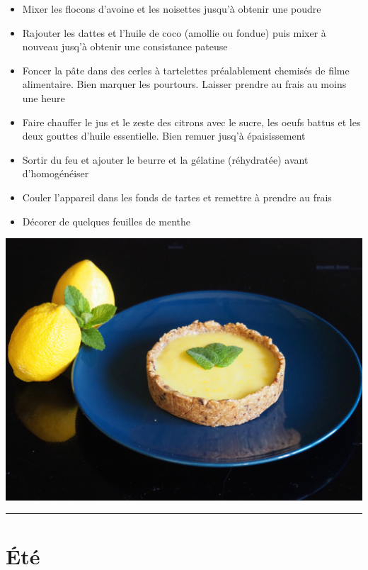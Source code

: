 \documentclass[]{book}
\providecommand{\tightlist}{%
  \setlength{\itemsep}{0pt}\setlength{\parskip}{0pt}}
\begin{document}
\begin{itemize}
\tightlist
\item
  Mixer les flocons d'avoine et les noisettes jusqu'à obtenir une poudre
\item
  Rajouter les dattes et l'huile de coco (amollie ou fondue) puis mixer à nouveau jusq'à obtenir une consistance pateuse
\item
  Foncer la pâte dans des cerles à tartelettes préalablement chemisés de filme alimentaire. Bien marquer les pourtours. Laisser prendre au frais au moins une heure
\item
  Faire chauffer le jus et le zeste des citrons avec le sucre, les oeufs battus et les deux gouttes d'huile essentielle. Bien remuer jusq'à épaisissement
\item
  Sortir du feu et ajouter le beurre et la gélatine (réhydratée) avant d'homogénéiser
\item
  Couler l'appareil dans les fonds de tartes et remettre à prendre au frais
\item
  Décorer de quelques feuilles de menthe
\end{itemize}

\begin{center}\includegraphics[width=0.9\linewidth]{photos/citron_menthe} \end{center}

\begin{center}\rule{0.5\linewidth}{0.5pt}\end{center}

\hypertarget{uxe9tuxe9}{%
\chapter*{Été}\label{uxe9tuxe9}}
\end{document}
